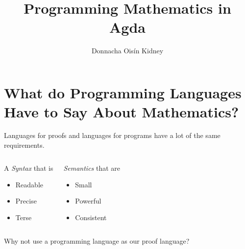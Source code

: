 \documentclass[usenames,dvipsnames]{beamer}
\title{Programming Mathematics in Agda}
\author{Donnacha Oisín Kidney}
\begin{document}
\maketitle
\tableofcontents

\section{What do Programming Languages Have to Say About Mathematics?}
\begin{frame}
  Languages for proofs and languages for programs have a lot of the same requirements.

  \pause
  \begin{columns}[T]
    \begin{block}{A \emph{Syntax} that is}
      \begin{itemize}
        \item Readable
        \item Precise
        \item Terse
      \end{itemize}
    \end{block}
    \pause
    \begin{block}{\emph{Semantics} that are}
      \begin{itemize}
        \item Small
        \item Powerful
        \item Consistent
      \end{itemize}
    \end{block}
  \end{columns}
\end{frame}
\begin{frame}[standout]
  Why not use a programming language as our proof language?
\end{frame}
\end{document}

